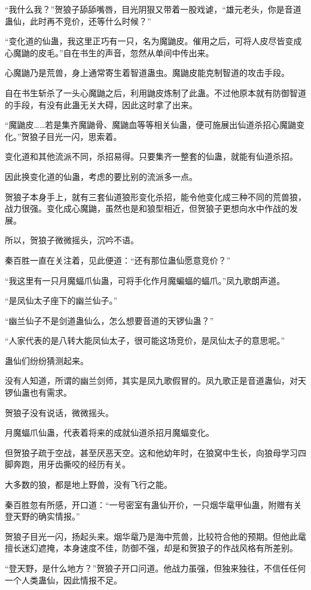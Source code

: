 \begin{this_body}
“我什么我？”贺狼子舔舔嘴唇，目光阴狠又带着一股戏谑，“雄元老头，你是音道蛊仙，此时再不竞价，还等什么时候？”

“变化道的仙蛊，我这里正巧有一只，名为魔鼬皮。催用之后，可将人皮尽皆变成心魔鼬的皮毛。”自在书生的声音，忽然从单间中传出来。

心魔鼬乃是荒兽，身上通常寄生着智道蛊虫。魔鼬皮能克制智道的攻击手段。

自在书生斩杀了一头心魔鼬之后，利用鼬皮炼制了此蛊。不过他原本就有防御智道的手段，有没有此蛊无关大碍，因此这时拿了出来。

“魔鼬皮……若是集齐魔鼬骨、魔鼬血等等相关仙蛊，便可施展出仙道杀招心魔鼬变化。”贺狼子目光一闪，思索着。

变化道和其他流派不同，杀招易得。只要集齐一整套的仙蛊，就能有仙道杀招。

因此换变化道的仙蛊，考虑的要比别的流派多一点。

贺狼子本身手上，就有三套仙道狼形变化杀招，能令他变化成三种不同的荒兽狼，战力很强。变化成心魔鼬，虽然也是和狼型相近，但贺狼子更想向水中作战的发展。

所以，贺狼子微微摇头，沉吟不语。

秦百胜一直在关注着，见此便道：“还有那位蛊仙愿意竞价？”

“我这里有一只月魔蝠爪仙蛊，可将手化作月魔蝙蝠的蝠爪。”凤九歌朗声道。

“是凤仙太子座下的幽兰仙子。”

“幽兰仙子不是剑道蛊仙么，怎么想要音道的天锣仙蛊？”

“人家代表的是八转大能凤仙太子，很可能这场竞价，是凤仙太子的意思呢。”

蛊仙们纷纷猜测起来。

没有人知道，所谓的幽兰剑师，其实是凤九歌假冒的。凤九歌正是音道蛊仙，对天锣仙蛊也有需求。

贺狼子没有说话，微微摇头。

月魔蝠爪仙蛊，代表着将来的成就仙道杀招月魔蝠变化。

但贺狼子疏于空战，甚至厌恶天空。这和他幼年时，在狼窝中生长，向狼母学习四脚奔跑，用牙齿撕咬的经历有关。

大多数的狼，都是地上野兽，没有飞行之能。

秦百胜忽有所感，开口道：“一号密室有蛊仙开价，一只烟华鼋甲仙蛊，附赠有关登天野的确实情报。”

贺狼子目光一闪，扬起头来。烟华鼋乃是海中荒兽，比较符合他的预期。但他此鼋擅长迷幻遮掩，本身速度不佳，防御不强，却是和贺狼子的作战风格有所差别。

“登天野，是什么地方？”贺狼子开口问道。他战力虽强，但独来独往，不信任任何一个人类蛊仙，因此情报不足。


\end{this_body}
